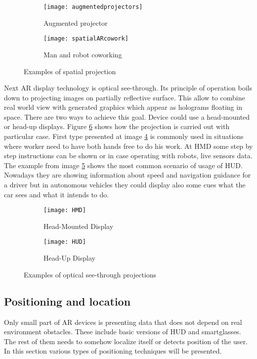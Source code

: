 \documentclass[printmode,en]{mgr}
\begin{document}
\begin{figure}[!ht]
\centering
\begin{subfigure}{.4\textwidth}
  \centering
  \texttt{[image: augmentedprojectors]}
  \caption{Augmented projector \cite{augmentedprojectors}}
  \label{fig:augmentedprojectors}
\end{subfigure}%
\begin{subfigure}{.4\textwidth}
  \centering
  \texttt{[image: spatialARcowork]}
  \caption{Man and robot coworking \cite{SpatialARCollaborative}}
  \label{fig:spatialARcowork}
\end{subfigure}
\caption{Examples of spatial projection}
\label{fig:spatialAR}
\end{figure}

Next AR display technology is optical see-through. Its principle of operation boils down to projecting images on partially reflective surface. This allow to combine real world view with generated graphics which appear as holograms floating in space. There are two ways to achieve this goal. Device could use a head-mounted or head-up displays. Figure \ref{fig:seeThroughAR} shows how the projection is carried out with particular case. First type presented at image \ref{fig:headMounted} is commonly used in situations where worker need to have both hands free to do his work. At HMD some step by step instructions can be shown or in case operating with robots, live sensors data. The example from image \ref{fig:headUp} shows the most common scenario of usage of HUD. Nowadays they are showing information about speed and navigation guidance for a driver but in autonomous vehicles they could display also some cues what the car sees and what it intends to do.

\begin{figure}[!ht]
\centering
\begin{subfigure}{.5\textwidth}
  \centering
  \texttt{[image: HMD]}
  \caption{Head-Mounted Display}
  \label{fig:headMounted}
\end{subfigure}%
\begin{subfigure}{.5\textwidth}
  \centering
  \texttt{[image: HUD]}
  \caption{Head-Up Display \cite{HUD}}
  \label{fig:headUp}
\end{subfigure}
\caption{Examples of optical see-through projections}
\label{fig:seeThroughAR}
\end{figure}

\subsection{Positioning and location}
Only small part of AR devices is presenting data that does not depend on real environment obstacles. These include basic versions of HUD and smartglasses. The rest of them needs to somehow localize itself or detects position of the user. In this section various types of positioning techniques will be presented.\\
\end{document}
